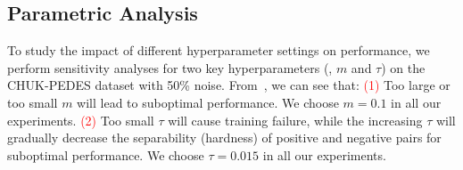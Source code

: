 \documentclass[10pt,twocolumn,letterpaper]{article}
\begin{document}
\begin{table}[h]
\centering
\vspace{-0.2cm}
\renewcommand{\arraystretch}{0.9}   
\setlength{}
    \caption{Ablation studies on the CHUK-PEDES dataset.}
    \label{tab_ab1}
\vspace{-0.5cm}
\end{table}

 
\subsection{Parametric Analysis}
To study the impact of different hyperparameter settings on performance,  we perform sensitivity analyses for two key hyperparameters  (\ie, $m$ and $\tau$) on the CHUK-PEDES dataset with 50\% noise.  From~, we can see that: \textcolor{red}{{(1)}} Too large or too small $m$ will lead to suboptimal performance. We choose $m=0.1$ in all our experiments. \textcolor{red}{{(2)}} Too small $\tau$ will cause training failure, while the increasing $\tau$ will gradually decrease the separability (hardness) of positive and negative pairs for suboptimal performance. We choose $\tau=0.015$ in all our experiments.
\end{document}
